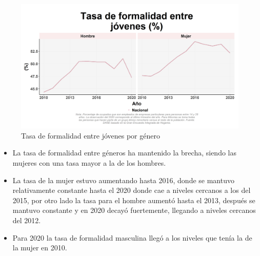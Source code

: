     \begin{figure}[H]
        \caption{Tasa de formalidad entre jóvenes por género \label{map_result_2} }
        \begin{center}
        \includegraphics[width=\textwidth,keepaspectratio]{img/var_65_trend.png}
        \end{center}
    \end{figure}
            \begin{itemize}
                \item La tasa de formalidad entre géneros ha mantenido la brecha, siendo las mujeres con una tasa mayor a la de los hombres.
                \item La tasa de la mujer estuvo aumentando hasta 2016, donde se mantuvo relativamente constante hasta el 2020 donde cae a niveles cercanos a los del 2015, por otro lado la tasa para el hombre aumentó hasta el 2013, después se mantuvo constante y en 2020 decayó fuertemente, llegando a niveles cercanos del 2012.
                \item Para 2020 la tasa de formalidad masculina llegó a los niveles que tenía la de la mujer en 2010.
                \end{itemize}

